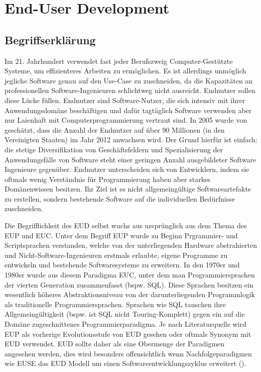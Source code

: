 
\section{End-User Development}
\subsection{Begriffserklärung}
Im 21. Jahrhundert verwendet fast jeder Berufszweig Computer-Gestützte Systeme, um effizienteres Arbeiten zu ermöglichen. Es ist allerdings unmöglich jegliche Software genau auf den Use-Case zu zuschneiden, da die Kapazitäten an professionellen Software-Ingenieuren schlichtweg nicht ausreicht. Endnutzer sollen diese Lücke füllen. Endnutzer sind Software-Nutzer, die sich intensiv mit ihrer Anwendungsdomäne beschäftigen und dafür tagtäglich Software verwenden aber nur Laienhaft mit Computerprogrammierung vertraut sind. In 2005 wurde von \cite{Scaffidi2005eudnumbers} geschätzt, dass die Anzahl der Endnutzer auf über 90 Millionen (in den Vereinigten Staaten) im Jahr 2012 anwachsen wird. Der Grund hierfür ist einfach: die stetige Diversifikation von Geschäftsfeldern und Spezialisierung der Anwendungsfälle von Software steht einer geringen Anzahl ausgebildeter Software Ingenieure gegenüber. Endnutzer unterscheiden sich von Entwicklern, indem sie oftmals wenig Verständnis für Programmierung haben aber starkes Domänenwissen besitzen. Ihr Ziel ist es nicht allgemeingültige Softwareartefakte zu erstellen, sondern bestehende Software auf die individuellen Bedürfnisse zuschneiden.

Die Begrifflichkeit des \acf{EUD} selbst wuchs aus ursprünglich aus dem Thema des \ac{EUP} und \ac{EUC}. Unter dem Begriff \ac{EUP} wurde zu Beginn Prgrammier- und Scriptsprachen verstanden, welche von der unterliegenden Hardware abstrahierten und Nicht-Software-Ingenieuren erstmals erlaubte, eigene Programme zu entwickeln und bestehende Softwaresysteme zu erweitern. In den 1970er und 1980er wurde aus diesem  Paradigma \ac{EUC}, unter dem man Programmiersprachen der vierten Generation zusammenfasst (bspw. SQL). Diese Sprachen besitzen ein wesentlich höheres Abstraktionsniveau von der darunterliegenden Programmlogik als traditionelle Programmiersprachen. Sprachen wie SQL tauschen ihre Allgemeingültigkeit (bspw. ist SQL nicht Touring-Komplett) gegen ein auf die Domäne zugeschnittenes Programmierparadigma. Je nach Literaturquelle wird \ac{EUP} als vorherige Evolutionsstufe von \ac{EUD} gesehen oder oftmals Synonym mit \ac{EUD} verwendet. \ac{EUD} sollte daher als eine Obermenge der Paradigmen angesehen werden, dies wird besonders offensichtlich wenn Nachfolgeparadigmen wie \ac{EUSE} das \ac{EUD} Modell um einen Softwareentwicklungszyklus erweitert (\cite{Ko2011EUSE}).

